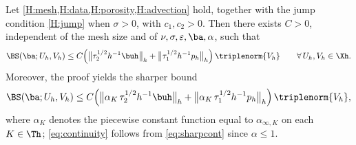 \begin{lemma}[Continuity]\label{lem:continuity}
Let \cref{H:mesh,H:data,H:porosity,H:advection} hold, together with the jump condition \cref{H:jump} when $\sigma>0$, with $c_1,c_2>0$. Then there exists $C>0$,
independent of the mesh size and of $\nu,\sigma,\varepsilon,\ba,\alpha$, such that
\begin{equation}\label{eq:continuity}
  \BS(\ba; U_h,V_h)
  \le C\Bigl(
  \bigl\lVert\tau_2^{1/2}h^{-1}\buh\bigr\rVert_h
  + \bigl\lVert\tau_1^{1/2}h^{-1}p_h\bigr\rVert_h
  \Bigr)\,\triplenorm{V_h}
  \qquad\forall\, U_h,V_h\in\Xh .
\end{equation}
Moreover, the proof yields the sharper bound
\begin{equation}\label{eq:sharpcont}
  \BS(\ba; U_h,V_h)
  \le C\Bigl(
  \bigl\lVert\alpha_K\,\tau_2^{1/2}h^{-1}\buh\bigr\rVert_h
  + \bigl\lVert\alpha_K\,\tau_1^{1/2}h^{-1}p_h\bigr\rVert_h
  \Bigr)\,\triplenorm{V_h},
\end{equation}
where $\alpha_K$ denotes the piecewise constant function equal to $\alpha_{\infty,K}$ on
each $K\in\Th$; \eqref{eq:continuity} follows from \eqref{eq:sharpcont} since
$\alpha\le 1$.
\end{lemma}

